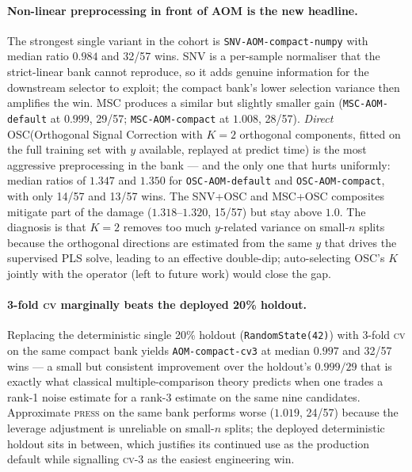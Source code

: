 \documentclass[review,a4paper]{elsarticle}
\newcommand{\AOM}{\textsc{AOM}\xspace}
\newcommand{\PLS}{\textsc{PLS}\xspace}
\newcommand{\SNV}{\textsc{SNV}\xspace}
\newcommand{\MSC}{\textsc{MSC}\xspace}
\newcommand{\OSC}{\textsc{OSC}\xspace}
\begin{document}
\paragraph{Non-linear preprocessing in front of \AOM is the new
headline.} The strongest single variant in the cohort is
\texttt{SNV-AOM-compact-numpy} with median ratio $0.984$ and 32/57
wins. \SNV is a per-sample normaliser that the strict-linear bank
cannot reproduce, so it adds genuine information for the downstream
selector to exploit; the compact bank's lower selection variance then
amplifies the win. \MSC produces a similar but slightly smaller gain
(\texttt{MSC-AOM-default} at $0.999$, 29/57; \texttt{MSC-AOM-compact}
at $1.008$, 28/57). \emph{Direct} \OSC (Orthogonal Signal Correction
with $K{=}2$ orthogonal components, fitted on the full training set
with $y$ available, replayed at predict time) is the most aggressive
preprocessing in the bank — and the only one that hurts uniformly:
median ratios of $1.347$ and $1.350$ for \texttt{OSC-AOM-default} and
\texttt{OSC-AOM-compact}, with only 14/57 and 13/57 wins. The
\SNV+\OSC and \MSC+\OSC composites mitigate part of the damage
($1.318$--$1.320$, 15/57) but stay above $1.0$. The diagnosis is that
$K{=}2$ removes too much $y$-related variance on small-$n$ splits
because the orthogonal directions are estimated from the same $y$
that drives the supervised \PLS solve, leading to an effective
double-dip; auto-selecting \OSC's $K$ jointly with the operator (left
to future work) would close the gap.

\paragraph{3-fold \textsc{cv} marginally beats the deployed 20\%
holdout.} Replacing the deterministic single 20\% holdout
(\texttt{RandomState(42)}) with 3-fold \textsc{cv} on the same compact
bank yields \texttt{AOM-compact-cv3} at median $0.997$ and 32/57 wins
— a small but consistent improvement over the holdout's
$0.999 / 29$ that is exactly what classical multiple-comparison theory
predicts when one trades a rank-1 noise estimate for a rank-3 estimate
on the same nine candidates. Approximate \textsc{press} on the same
bank performs worse ($1.019$, 24/57) because the leverage adjustment
is unreliable on small-$n$ splits; the deployed deterministic holdout
sits in between, which justifies its continued use as the production
default while signalling \textsc{cv}-3 as the easiest engineering win.
\end{document}
